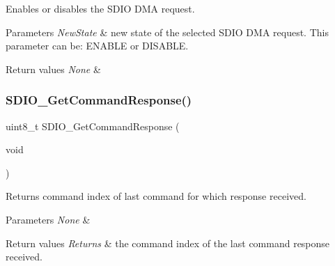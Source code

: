 Enables or disables the S\+D\+IO D\+MA request. 


\begin{DoxyParams}{Parameters}
{\em New\+State} & new state of the selected S\+D\+IO D\+MA request. This parameter can be\+: E\+N\+A\+B\+LE or D\+I\+S\+A\+B\+LE. \\
\hline
\end{DoxyParams}

\begin{DoxyRetVals}{Return values}
{\em None} & \\
\hline
\end{DoxyRetVals}
\mbox{\label{group___s_d_i_o___exported___functions_ga9badf271c818e09da301d715c4ad0e5b}} 
\subsubsection{\texorpdfstring{SDIO\_GetCommandResponse()}{SDIO\_GetCommandResponse()}}
{\footnotesize\ttfamily uint8\+\_\+t S\+D\+I\+O\+\_\+\+Get\+Command\+Response (\begin{DoxyParamCaption}\item[{void}]{ }\end{DoxyParamCaption})}



Returns command index of last command for which response received. 


\begin{DoxyParams}{Parameters}
{\em None} & \\
\hline
\end{DoxyParams}

\begin{DoxyRetVals}{Return values}
{\em Returns} & the command index of the last command response received. \\
\hline
\end{DoxyRetVals}
\mbox{\label{group___s_d_i_o___exported___functions_ga7a28aaa2c25a9a5a8db1f49b0e8c9d0a}} 
